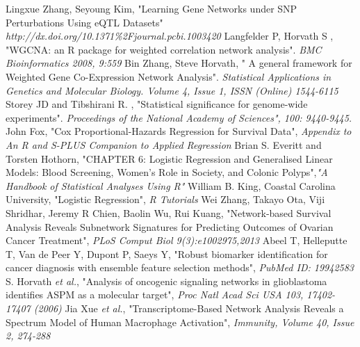 \documentclass{ba-kecs}
\numberwithin{figure}{section}
\numberwithin{equation}{section}
\begin{document}
\begin{thebibliography}{99}
 Lingxue Zhang, Seyoung Kim, "Learning Gene Networks under SNP Perturbations Using eQTL Datasets" \emph{http://dx.doi.org/10.1371\%2Fjournal.pcbi.1003420}
 Langfelder P, Horvath S , "WGCNA: an R package for weighted correlation network analysis". \emph{BMC Bioinformatics 2008, 9:559}
 Bin Zhang, Steve Horvath, " A general framework for Weighted Gene Co-Expression Network Analysis". \emph{Statistical Applications in Genetics and Molecular Biology. Volume 4, Issue 1, ISSN (Online) 1544-6115}
 Storey JD and Tibshirani R. , "Statistical significance for genome-wide experiments".\emph{ Proceedings of the National Academy of Sciences", 100: 9440-9445.}
 John Fox, "Cox Proportional-Hazards Regression for Survival Data", \emph{Appendix to An R and S-PLUS Companion to Applied Regression}
 Brian S. Everitt and Torsten Hothorn, "CHAPTER 6: Logistic Regression and Generalised Linear Models: Blood Screening, Women’s Role in Society, and Colonic Polyps",\emph{"A Handbook of Statistical Analyses Using R"}
 William B. King, Coastal Carolina University, "Logistic Regression", \emph{R Tutorials} 
 Wei Zhang, Takayo Ota, Viji Shridhar, Jeremy R Chien, Baolin Wu, Rui Kuang, "Network-based Survival Analysis Reveals Subnetwork Signatures for Predicting Outcomes of Ovarian Cancer Treatment", \emph{PLoS Comput Biol 9(3):e1002975,2013}
 Abeel T, Helleputte T, Van de Peer Y, Dupont P, Saeys Y, "Robust biomarker identification for cancer diagnosis with ensemble feature selection methods", \emph{PubMed ID: 19942583}
 S. Horvath \emph{et al.}, "Analysis of oncogenic signaling networks in glioblastoma identifies ASPM as a molecular target", \emph{Proc Natl Acad Sci USA 103, 17402-17407 (2006)}
 Jia Xue \emph{et al.}, "Transcriptome-Based Network Analysis Reveals a Spectrum Model of Human Macrophage Activation", \emph{Immunity, Volume 40, Issue 2, 274-288}
\end{thebibliography}

\appendix
\end{document}
